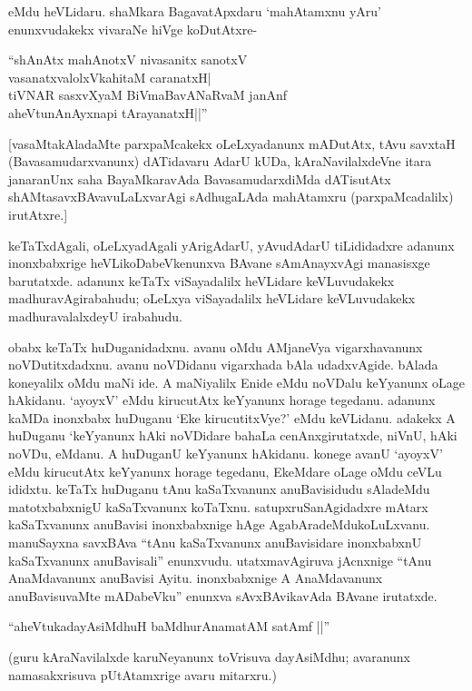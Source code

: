 eMdu heVLidaru. shaMkara BagavatApxdaru `mahAtamxnu yAru' enunxvudakekx vivaraNe hiVge koDutAtxre-

\begin{shloka}
``shAnAtx mahAnotxV nivasanitx sanotxV\\
vasanatxvalolxVkahitaM caranatxH|\\
tiVNAR sasxvXyaM BiVmaBavANaRvaM janAnf\\
aheVtunA\s nAyxnapi tArayanatxH||''
\end{shloka}

[vasaMtakAladaMte parxpaMcakekx oLeLxyadanunx mADutAtx, tAvu savxtaH (Bavasamudarxvanunx) dATidavaru AdarU kUDa, kAraNavilalxdeVne itara janaranUnx saha BayaMkaravAda BavasamudarxdiMda dATisutAtx shAMtasavxBAvavuLaLxvarAgi sAdhugaLAda mahAtamxru (parxpaMcadalilx) irutAtxre.]

keTaTxdAgali, oLeLxyadAgali yArigAdarU, yAvudAdarU tiLididadxre adanunx inonxbabxrige heVLikoDabeVkenunxva BAvane sAmAnayxvAgi manasisxge barutatxde. adanunx keTaTx viSayadalilx heVLidare keVLuvudakekx madhuravAgirabahudu; oLeLxya viSayadalilx heVLidare keVLuvudakekx madhuravalalxdeyU irabahudu.

obabx keTaTx huDuganidadxnu. avanu oMdu AMjaneVya vigarxhavanunx noVDutitxdadxnu. avanu noVDidanu vigarxhada bAla udadxvAgide. bAlada koneyalilx oMdu maNi ide. A maNiyalilx Enide eMdu noVDalu keYyanunx oLage hAkidanu. `ayoyxV' eMdu kirucutAtx keYyanunx horage tegedanu. adanunx kaMDa inonxbabx huDuganu `Eke kirucutitxVye?' eMdu keVLidanu. adakekx A huDuganu `keYyanunx hAki noVDidare bahaLa cenAnxgirutatxde, niVnU, hAki noVDu, eMdanu. A huDuganU keYyanunx hAkidanu. konege avanU `ayoyxV' eMdu kirucutAtx keYyanunx horage tegedanu, EkeMdare oLage oMdu ceVLu ididxtu. keTaTx huDuganu tAnu kaSaTxvanunx anuBavisidudu sAladeMdu matotxbabxnigU kaSaTxvanunx koTaTxnu. satupxruSanAgidadxre mAtarx kaSaTxvanunx anuBavisi inonxbabxnige hAge AgabAradeMdukoLuLxvanu. manuSayxna savxBAva ``tAnu kaSaTxvanunx anuBavisidare inonxbabxnU kaSaTxvanunx anuBavisali'' enunxvudu. utatxmavAgiruva jAcnxnige ``tAnu AnaMdavanunx anuBavisi Ayitu. inonxbabxnige A AnaMdavanunx anuBavisuvaMte mADabeVku'' enunxva sAvxBAvikavAda BAvane irutatxde. 

\begin{shloka}
``aheVtukadayAsiMdhuH baMdhurAnamatAM satAmf ||''
\end{shloka}

(guru kAraNavilalxde karuNeyanunx toVrisuva dayAsiMdhu; avaranunx namasakxrisuva pUtAtamxrige avaru mitarxru.)

